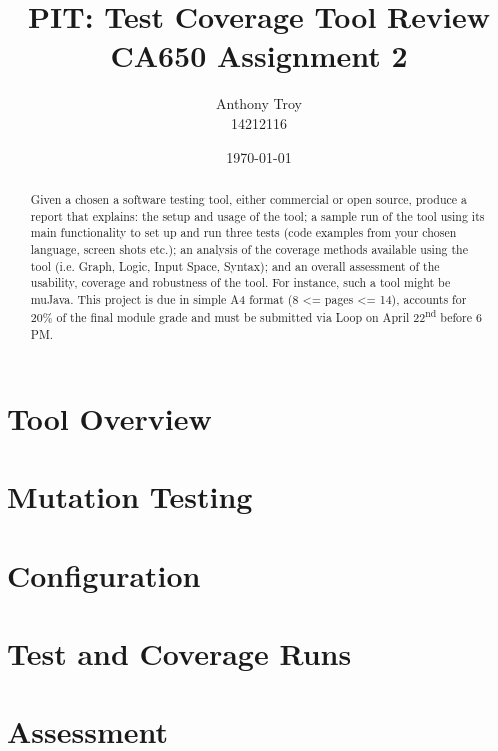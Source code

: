\documentclass[a4paper]{article}
\title{PIT: Test Coverage Tool Review\\ \Large{CA650 Assignment 2}}
\author{Anthony Troy\\ \small{14212116}}
\date{\today}
\begin{document}
\maketitle

\renewcommand{\abstractname}{Requirements}
\begin{abstract}
Given a chosen a software testing tool, either commercial or open source, produce a report that explains: the setup and usage of the tool; a sample run of the tool using its main functionality to set up and run three tests (code examples from your chosen language, screen shots etc.); an analysis of the coverage methods available using the tool (i.e. Graph, Logic, Input Space, Syntax); and an overall assessment of the usability, coverage and robustness of the tool. For instance, such a tool might be muJava. This project is due in simple A4 format (8 \textless= pages \textless= 14), accounts for  20\% of the final module grade and must be submitted via Loop on April 22\textsuperscript{nd} before 6 \MakeUppercase{pm}.



\end{abstract}

\vspace{3.5cm}
\tableofcontents

\newpage

\section{Tool Overview}
\lipsum 


\section{Mutation Testing}
\lipsum


\section{Configuration}
\lipsum


\section{Test and Coverage Runs}
\lipsum


\section{Assessment}
\lipsum
\end{document}
